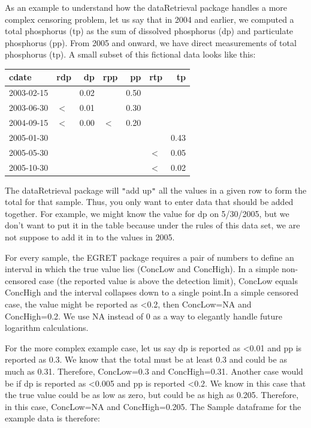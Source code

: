 \documentclass[a4paper,11pt]{article}
\begin{document}
As an example to understand how the dataRetrieval package handles a more complex censoring problem, let us say that in 2004 and earlier, we computed a total phosphorus (tp) as the sum of dissolved phosphorus (dp) and particulate phosphorus (pp). From 2005 and onward, we have direct measurements of total phosphorus (tp). A small subset of this fictional data looks like this:

\begin{center}

\begin{tabular}{llrlrlr}
  \hline
cdate & rdp & dp & rpp & pp & rtp & tp \\ 
  \hline
2003-02-15 &  & 0.02 &  & 0.50 &  &  \\ 
  2003-06-30 & $<$ & 0.01 &  & 0.30 &  &  \\ 
  2004-09-15 & $<$ & 0.00 & $<$ & 0.20 &  &  \\ 
  2005-01-30 &  &  &  &  &  & 0.43 \\ 
  2005-05-30 &  &  &  &  & $<$ & 0.05 \\ 
  2005-10-30 &  &  &  &  & $<$ & 0.02 \\ 
   \hline
\end{tabular}
\end{center}


The dataRetrieval package will \texttt{"}add up\texttt{"} all the values in a given row to form the total for that sample. Thus, you only want to enter data that should be added together. For example, we might know the value for dp on 5/30/2005, but we don't want to put it in the table because under the rules of this data set, we are not suppose to add it in to the values in 2005.

For every sample, the EGRET package requires a pair of numbers to define an interval in which the true value lies (ConcLow and ConcHigh). In a simple non-censored case (the reported value is above the detection limit), ConcLow equals ConcHigh and the interval collapses down to a single point.In a simple censored case, the value might be reported as <0.2, then ConcLow=NA and ConcHigh=0.2. We use NA instead of 0 as a way to elegantly handle future logarithm calculations.

For the more complex example case, let us say dp is reported as <0.01 and pp is reported as 0.3. We know that the total must be at least 0.3 and could be as much as 0.31. Therefore, ConcLow=0.3 and ConcHigh=0.31. Another case would be if dp is reported as <0.005 and pp is reported <0.2. We know in this case that the true value could be as low as zero, but could be as high as 0.205. Therefore, in this case, ConcLow=NA and ConcHigh=0.205. The Sample dataframe for the example data is therefore:
\end{document}
